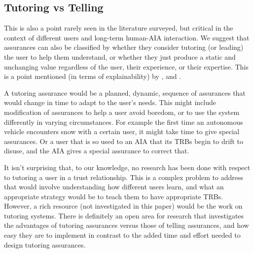 \subsection{Tutoring vs Telling} \label{sec:teach_tell}
    This is also a point rarely seen in the literature surveyed, but critical in the context of different users and long-term human-AIA interaction. We suggest that assurances can also be classified by whether they consider tutoring (or leading) the user to help them understand, or whether they just produce a static and unchanging value regardless of the user, their experience, or their expertise. This is a point mentioned (in terms of explainability) by \citet{Lacave2002-cu}, and \citet{Lacher2014-yc}.

    A tutoring assurance would be a planned, dynamic, sequence of assurances that would change in time to adapt to the user's needs. This might include modification of assurances to help a user avoid boredom, or to use the system differently in varying circumstances. For example the first time an autonomous vehicle encounters snow with a certain user, it might take time to give special assurances. Or a user that is so used to an AIA that its TRBs begin to drift to disuse, and the AIA gives a special assurance to correct that.

    It isn't surprising that, to our knowledge, no research has been done with respect to tutoring a user in a trust relationship. This is a complex problem to address that would involve understanding how different users learn, and what an appropriate strategy would be to teach them to have appropriate TRBs. However, a rich resource (not investigated in this paper) would be the work on tutoring systems. There is definitely an open area for research that investigates the advantages of tutoring assurances versus those of telling assurances, and how easy they are to implement in contrast to the added time and effort needed to design tutoring assurances.
